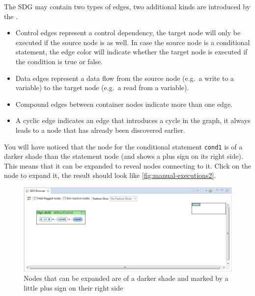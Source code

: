 The SDG may contain two types of edges, two additional kinds are introduced by the \SB.

\begin{itemize}
  \item Control edges represent a control dependency, the target node will only be executed if the source node is as 
  well. In case the source node is a conditional statement, the edge color will indicate whether the target node is 
  executed if the condition is true or false.
  
  \item Data edges represent a data flow from the source node (e.g.\ a write to a variable) to the target node (e.g.\ a 
  read from a variable).
  
  \item Compound edges between container nodes indicate more than one edge.
  
  \item A cyclic edge indicates an edge that introduces a cycle in the graph, it always leads to a node that has 
  already been discovered earlier.
\end{itemize}

You will have noticed that the node for the conditional statement \lstinline|cond1| is of a darker shade than the 
statement node (and shows a plus sign on its right side). This means that it can be expanded to reveal nodes connecting 
to it. Click on the node to expand it, the result should look like \autoref{fig:manual-executions2}.

\begin{figure}[hp]
  \centering
    \includegraphics[width=\textwidth]{bilder/manual-executions2}
  \caption[Graph showing a node that can be expanded, indicated by a little plus sign]
    {Nodes that can be expanded are of a darker shade and marked by a little plus sign on their right side}
  \label{fig:manual-executions2}
\end{figure}


